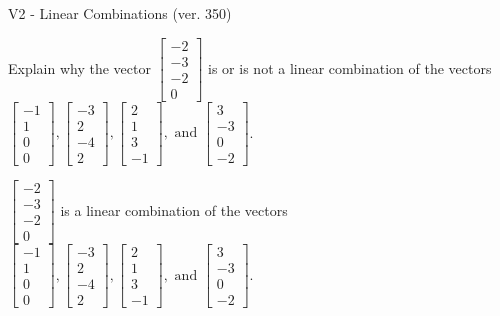 \begin{exercise}
  \begin{exerciseTitle}V2 - Linear Combinations (ver. 350)\end{exerciseTitle}
  \begin{exerciseStatement}
    Explain why the vector \(\left[\begin{array}{c}
-2 \\
-3 \\
-2 \\
0
\end{array}\right]\)  is or is not a linear 
	combination of the vectors \(\left[\begin{array}{c}
-1 \\
1 \\
0 \\
0
\end{array}\right] , \left[\begin{array}{c}
-3 \\
2 \\
-4 \\
2
\end{array}\right] , \left[\begin{array}{c}
2 \\
1 \\
3 \\
-1
\end{array}\right] , \text{ and } \left[\begin{array}{c}
3 \\
-3 \\
0 \\
-2
\end{array}\right]\).
	


  \end{exerciseStatement}
  \begin{exerciseAnswer}
   \(\left[\begin{array}{c}
-2 \\
-3 \\
-2 \\
0
\end{array}\right]\) 
  	 is  
	a linear combination of the vectors \(\left[\begin{array}{c}
-1 \\
1 \\
0 \\
0
\end{array}\right] , \left[\begin{array}{c}
-3 \\
2 \\
-4 \\
2
\end{array}\right] , \left[\begin{array}{c}
2 \\
1 \\
3 \\
-1
\end{array}\right] , \text{ and } \left[\begin{array}{c}
3 \\
-3 \\
0 \\
-2
\end{array}\right]\).


\end{exerciseAnswer}
\end{exercise}
